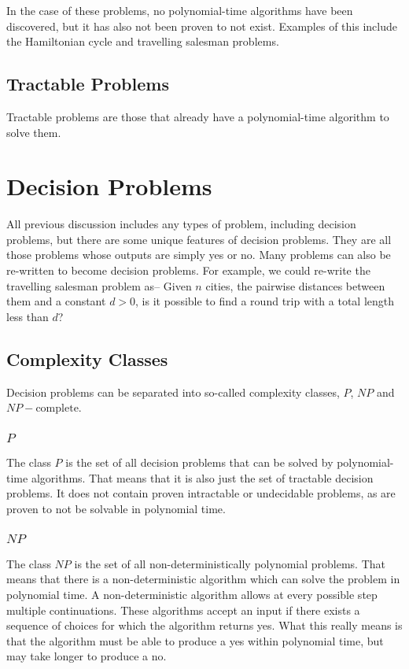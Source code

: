 In the case of these problems, no polynomial-time algorithms have been discovered, but it has also not been proven to
 not exist. Examples of this include the Hamiltonian cycle and travelling salesman problems.

\subsection*{Tractable Problems}

Tractable problems are those that already have a polynomial-time algorithm to solve them.


\section*{Decision Problems}

All previous discussion includes any types of problem, including decision problems, but there are some unique features
 of decision problems. They are all those problems whose outputs are simply yes or no. Many problems can also be
 re-written to become decision problems. For example, we could re-write the travelling salesman problem as-- Given $n$
 cities, the pairwise distances between them and a constant $d > 0$, is it possible to find a round trip with a total
 length less than $d$?

\subsection*{Complexity Classes}

Decision problems can be separated into so-called complexity classes, $P$, $NP$ and $NP-\mathrm{complete}$.

\subsubsection*{$P$}

The class $P$ is the set of all decision problems that can be solved by polynomial-time algorithms. That means that it
 is also just the set of tractable decision problems. It does not contain proven intractable or undecidable problems,
 as are proven to not be solvable in polynomial time.

\subsubsection*{$NP$}

The class $NP$ is the set of all non-deterministically polynomial problems. That means that there is a non-deterministic
 algorithm which can solve the problem in polynomial time. A non-deterministic algorithm allows at every possible step
 multiple continuations. These algorithms accept an input if there exists a sequence of choices for which the algorithm
 returns yes. What this really means is that the algorithm must be able to produce a yes within polynomial time, but
 may take longer to produce a no.

